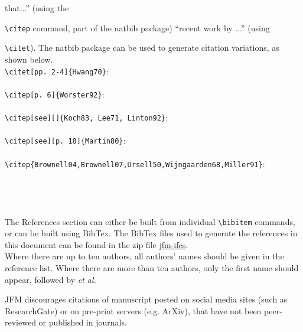 \documentclass[lineno]{jfm}
\begin{document}
\citep{Rogallo81} that...'' (using the {\verb}\citep} command, part of the natbib package) ``recent work by \citet{Dennis85}...'' (using {\verb}\citet}).
The natbib package can be used to generate citation variations, as shown below.\\
\verb#\citet[pp. 2-4]{Hwang70}#:\\
\citet[pp. 2-4]{Hwang70} \\
\verb#\citep[p. 6]{Worster92}#:\\
\citep[p. 6]{Worster92}\\
\verb#\citep[see][]{Koch83, Lee71, Linton92}#:\\
\citep[see][]{Koch83, Lee71, Linton92}\\
\verb#\citep[see][p. 18]{Martin80}#:\\
\citep[see][p. 18]{Martin80}\\
\verb#\citep{Brownell04,Brownell07,Ursell50,Wijngaarden68,Miller91}#:\\
\citep{Brownell04,Brownell07,Ursell50,Wijngaarden68,Miller91}\\
\citep{Briukhanovetal1967}\\
\cite{Bouguet01}\\
\citep{JosephSaut1990}\\
The References section can either be built from individual \verb#\bibitem# commands, or can be built using BibTex. The BibTex files used to generate the references in this document can be found in the zip file \href{http://journals.cambridge.org/data/relatedlink/jfm-ifc.zip}{jfm-ifcs}.\\
Where there are up to ten authors, all authors' names should be given in the reference list. Where there are more than ten authors, only the first name should appear, followed by {\it {et al.}}

JFM discourages citations of manuscript posted on social media sites (such as ResearchGate) or on pre-print servers (e.g. ArXiv), that have not been peer-reviewed or published in journals.



}}
\end{document}
